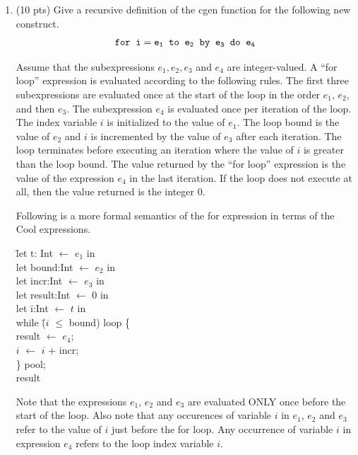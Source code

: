 \documentclass[10pt]{article}
\begin{document}
\begin{enumerate}
\item (10 pts) Give a recursive definition of the cgen function for the following new construct.
\begin{eqnarray*}
\tt{for}\;\; i = e_1 \;\;to\;\; e_2 \;\;\tt{by}\;\; e_3 \;\;\tt{do }\;\; e_4
\end{eqnarray*}

Assume that the subexpressions $e_1, e_2, e_3$ and $e_4$ are
integer-valued. A ``for loop'' expression is evaluated according to
the following rules. The first three subexpressions are evaluated once
at the start of the loop in the order $e_1$, $e_2$, and then $e_3$.
The subexpression $e_4$ is evaluated once per iteration of the loop.
The index variable $i$ is initialized to the value of $e_1$.
The loop bound is the value of $e_2$ and $i$ is incremented by the
value of $e_3$ after each iteration. The loop terminates before
executing an iteration where the value of $i$ is greater than the
loop bound. The value returned by the ``for loop'' expression is the value of the
expression $e_4$ in the last iteration. If the loop does not execute
at all, then the value returned is the integer $0$.

Following is a more formal semantics of the for expression in terms of the Cool
expressions.
\begin{tabbing}
  \hspace*{3mm} \= let t: Int $\leftarrow$ $e_1$ in \\
  \> let bound:Int  $\leftarrow$ $e_2$ in \\
  \> let incr:Int  $\leftarrow$ $e_3$ in \\
  \> let result:Int  $\leftarrow$ $0$ in \\
  \> let \= i:Int $\leftarrow$ $t$ in   \\
   \>  \> while \= ($i$ $\leq$ bound) loop \{ \\
     \>\>\>   result $\leftarrow$ $e_4$; \\
\> \> \> $i$ $\leftarrow$ $i$ + incr; \\
     \> \> \} pool; \\
     \> \> result  \\
\end{tabbing}

Note that the expressions $e_1$, $e_2$ and $e_3$ are evaluated ONLY once before the start of the loop.
Also note that any occurences of variable $i$ in $e_1$, $e_2$ and
$e_3$ refer to the value of $i$
just before the for loop.
Any occurrence of variable $i$ in expression $e_4$ refers to the loop index variable $i$.




\end{enumerate}
\end{document}
